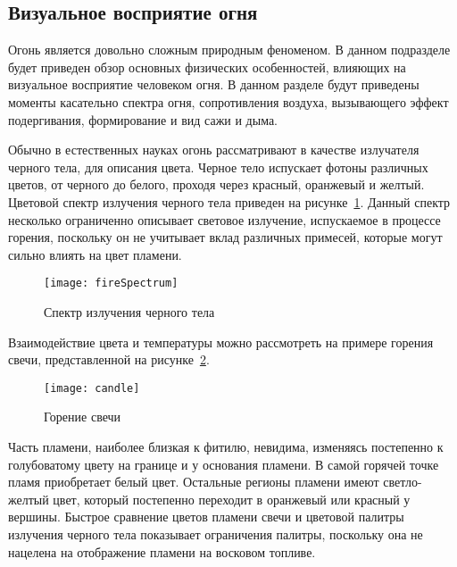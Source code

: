 \subsection{Визуальное восприятие огня}%
\label{section:firePerception}

Огонь является довольно сложным природным феноменом. В данном подразделе будет
приведен обзор основных физических особенностей, влияющих на визуальное
восприятие человеком огня. В данном разделе будут приведены моменты касательно
спектра огня, сопротивления воздуха, вызывающего эффект подергивания,
формирование и вид сажи и дыма.

Обычно в естественных науках огонь рассматривают в качестве излучателя черного
тела, для описания цвета. Черное тело испускает фотоны различных цветов, от
черного до белого, проходя через красный, оранжевый и желтый. Цветовой спектр
излучения черного тела приведен на рисунке~\ref{fig:fireSpectrum}. Данный спектр
несколько ограниченно описывает световое излучение, испускаемое в процессе
горения, поскольку он не учитывает вклад различных примесей, которые могут
сильно влиять на цвет пламени.
\begin{figure}[htb]
	\centering
    \texttt{[image: fireSpectrum]}
	\caption{Спектр излучения черного тела}%
    \label{fig:fireSpectrum}
\end{figure}

Взаимодействие цвета и температуры можно рассмотреть на примере горения свечи,
представленной на рисунке~\ref{fig:candle}.
\begin{figure}[htb]
	\centering
    \texttt{[image: candle]}
	\caption{Горение свечи}%
    \label{fig:candle}
\end{figure}
Часть пламени, наиболее близкая к фитилю, невидима, изменяясь постепенно к
голубоватому цвету на границе и у основания пламени. В самой горячей точке пламя
приобретает белый цвет. Остальные регионы пламени имеют светло-желтый цвет,
который постепенно переходит в оранжевый или красный у вершины. Быстрое
сравнение цветов пламени свечи и цветовой палитры излучения черного тела
показывает ограничения палитры, поскольку она не нацелена на отображение пламени
на восковом топливе.

